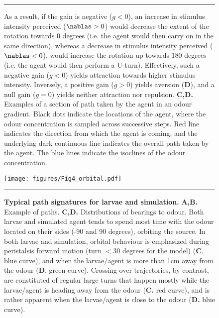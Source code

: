 \documentclass[11pt,a4paper]{article}
\begin{document}
\begin{figure}
\ContinuedFloat
\caption{
As a result, if the gain is negative ($g<0$), an increase in stimulus intensity perceived ($\nablas>0$) would decrease the extent of the rotation towards 0 degrees (i.e. the agent would then carry on in the same direction), whereas a decrease in stimulus intensity perceived ($\nablas<0$), would increase the rotation up towards 180 degrees (i.e. the agent would then perform a U-turn). Effectively, such a negative gain ($g<0$) yields attraction towards higher stimulus intensity. Inversely, a positive gain ($g>0$) yields aversion ({\bf D}), and a null gain ($g=0$) yields neither attraction nor repulsion.
{\bf C,D.} Examples of a section of path taken by the agent in an odour gradient. Black dots indicate the locations of the agent, where the odour concentration is sampled across successive steps. Red line indicates the direction from which the agent is coming, and the underlying dark continuous line indicates the overall path taken by the agent. The blue lines indicate the isoclines of the odour concentration.
}
\hrule
\end{figure}


\begin{figure}
\begin{center}
\texttt{[image: figures/Fig4\_orbital.pdf]}
\caption{{\bf Typical path signatures for larvae and simulation.} {\bf A,B.} Example of paths. {\bf C,D.} Distributions of bearings to odour.
 Both larvae and simulated agent tends to spend most time with the odour located on their sides (-90 and 90 degrees), orbiting the source. In both larvae and simulation, orbital behaviour is emphasized during peristalsis forward motion (turn $<30$ degrees for the model) ({\bf C}. blue curve), and when the larvae/agent is more than 1cm away from the odour ({\bf D}. green curve). Crossing-over trajectories, by contrast, are constituted of regular large turns that happen mostly while the larvae/agent is heading away from the odour ({\bf C.} red curve), and is rather apparent when the larvae/agent is close to the odour ({\bf D.} blue curve).
\label{fig:PathSignatures}}
\hrule
\end{center}
\end{figure}
\end{document}
